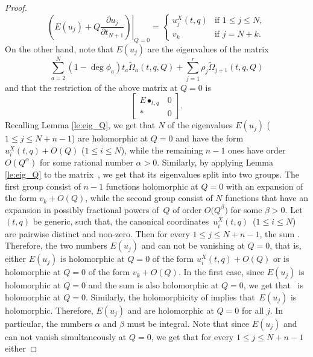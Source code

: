 \documentclass[pdftex]{sigma}
\numberwithin{equation}{section}
\begin{document}
\begin{proof}
\[
\left.
\left(
E(u_j) + Q\frac{\partial u_j}{\partial t_{N+1}}
\right)
\right|_{Q=0} =
\begin{cases}
u_j^X(t,q) & \mbox{if } 1\leq j\leq N,\\
v_k & \mbox{if } j=N+k.
\end{cases}
\]
On the other hand, note that $E(u_j)$ are the eigenvalues of the matrix
\[
\sum_{a=2}^N (1-\operatorname{deg}\phi_a)
t_a \widetilde{\Omega}_a(t,q,Q) +
\sum_{j=1}^r \rho_j \widetilde{\Omega}_{j+1}(t,q,Q)
\]
and that the restriction of the above matrix at $Q=0$ is
\[
\begin{bmatrix}
E\bullet_{t,q} & 0 \\
* & 0
\end{bmatrix}.
\]
Recalling Lemma \ref{le:eig_Q}, we get that $N$ of the eigenvalues $E(u_j)$ ($1\leq j\leq N+n-1$) are holomorphic at $Q=0$ and have the form $u_i^X(t,q)+O(Q)$ ($1\leq i\leq N$), while the remaining $n-1$ ones have order~$O(Q^\alpha)$ for some rational number $\alpha>0$. Similarly, by applying Lemma \ref{le:eig_Q} to the matrix~, we get that its eigenvalues  split into two groups. The first group consist of $n-1$ functions holomorphic at $Q=0$ with an expansion of the form $v_k + O(Q)$, while the second group consist of $N$ functions that have an expansion in possibly fractional powers of~$Q$ of order $O\big(Q^\beta\big)$ for some $\beta>0$. Let $(t,q)$ be generic, such that, the canonical coordinates~${u_i^X(t,q)}$~($1\leq i\leq N$) are pairwise distinct and non-zero. Then for every $1\leq j\leq N+n-1$, the sum . Therefore, the two numbers $E(u_j)$ and  can not be vanishing at $Q=0$, that is, either $E(u_j)$ is holomorphic at $Q=0$ of the form $u_i^X(t,q)+O(Q)$ or  is holomorphic at $Q=0$ of the form $v_k+O(Q)$. In the first case, since $E(u_j)$ is holomorphic at $Q=0$ and the sum  is also holomorphic at $Q=0$, we get that~ is holomorphic at $Q=0$. Similarly, the holomorphicity of  implies that~$E(u_j)$ is holomorphic. Therefore, $E(u_j)$ and  are holomorphic at $Q=0$ for all $j$. In particular, the numbers $\alpha$ and $\beta$ must be integral. Note that since $E(u_j)$ and  can not vanish simultaneously at $Q=0$, we get that for every $1\leq j\leq N+n-1$ either

\end{proof}
\end{document}
